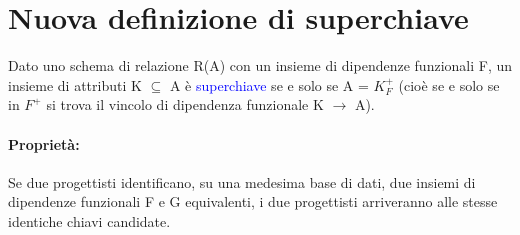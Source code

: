 \section{Nuova definizione di superchiave}

Dato uno schema di relazione R(A) con un insieme di dipendenze funzionali F, un insieme di attributi K $\subseteq$ A è
\textcolor{blue}{superchiave} se e solo se A = $K_F^+$ (cioè se e solo se in $F^+$ si trova il vincolo di dipendenza funzionale K $\rightarrow$ A).

\paragraph{Proprietà:} Se due progettisti identificano, su una medesima base di dati, due insiemi di dipendenze funzionali F e G equivalenti, i due progettisti arriveranno alle stesse identiche chiavi candidate.
